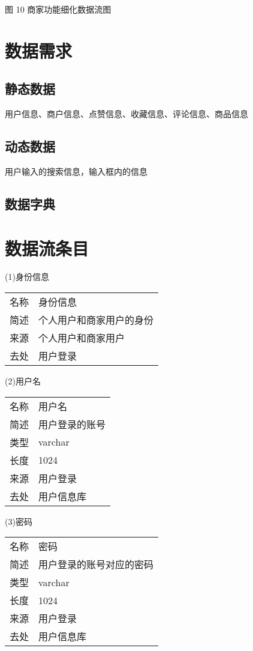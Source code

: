图 10 商家功能细化数据流图

\section{数据需求}

\subsection{静态数据}

用户信息、商户信息、点赞信息、收藏信息、评论信息、商品信息

\subsection{动态数据}

用户输入的搜索信息，输入框内的信息

\subsection{数据字典}

\section{数据流条目}

(1)身份信息

\begin{longtable}[]{@{}ll@{}}
\toprule
名称 & 身份信息\tabularnewline
简述 & 个人用户和商家用户的身份\tabularnewline
来源 & 个人用户和商家用户\tabularnewline
去处 & 用户登录\tabularnewline
\bottomrule
\end{longtable}

(2)用户名

\begin{longtable}[]{@{}ll@{}}
\toprule
名称 & 用户名\tabularnewline
简述 & 用户登录的账号\tabularnewline
类型 & varchar\tabularnewline
长度 & 1024\tabularnewline
来源 & 用户登录\tabularnewline
去处 & 用户信息库\tabularnewline
\bottomrule
\end{longtable}

(3)密码

\begin{longtable}[]{@{}ll@{}}
\toprule
名称 & 密码\tabularnewline
简述 & 用户登录的账号对应的密码\tabularnewline
类型 & varchar\tabularnewline
长度 & 1024\tabularnewline
来源 & 用户登录\tabularnewline
去处 & 用户信息库\tabularnewline
\bottomrule
\end{longtable}

